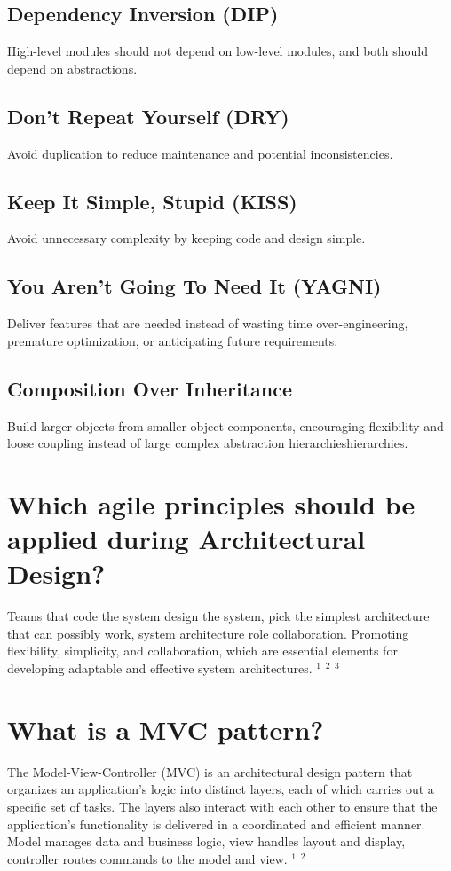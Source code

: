 \subsection{Dependency Inversion (DIP)}
High-level modules should not depend on low-level modules, and both should depend on abstractions.
\subsection{Don't Repeat Yourself (DRY)}
Avoid duplication to reduce maintenance and potential inconsistencies.
\subsection{Keep It Simple, Stupid (KISS)}
Avoid unnecessary complexity by keeping code and design simple.
\subsection{You Aren't Going To Need It (YAGNI)}
Deliver features that are needed instead of wasting time over-engineering, premature optimization, or anticipating future requirements.
\subsection{Composition Over Inheritance}
Build larger objects from smaller object components, encouraging flexibility and loose coupling instead of large complex abstraction hierarchieshierarchies.

\section{Which agile principles should be applied during Architectural Design?}
Teams that code the system design the system, pick the simplest architecture that can possibly work, system architecture role collaboration. Promoting flexibility, simplicity, and collaboration, which are essential elements for developing adaptable and effective system architectures. 
\href{https://softwareengineering.stackexchange.com/questions/165971/how-is-architectural-design-done-in-an-agile-environment}{$^1$}
\href{https://www.linkedin.com/advice/1/how-can-agile-principles-help-you-develop-better}{$^2$}
\href{https://scaledagileframework.com/agile-architecture/}{$^3$}

\section{What is a MVC pattern?}
The Model-View-Controller (MVC) is an architectural design pattern that organizes an application's logic into distinct layers, each of which carries out a specific set of tasks. The layers also interact with each other to ensure that the application's functionality is delivered in a coordinated and efficient manner. Model manages data and business logic, view handles layout and display, controller routes commands to the model and view. 
\href{https://developer.mozilla.org/en-US/docs/Glossary/MVC}{$^1$}
\href{https://www.techtarget.com/whatis/definition/model-view-controller-MVC}{$^2$}
